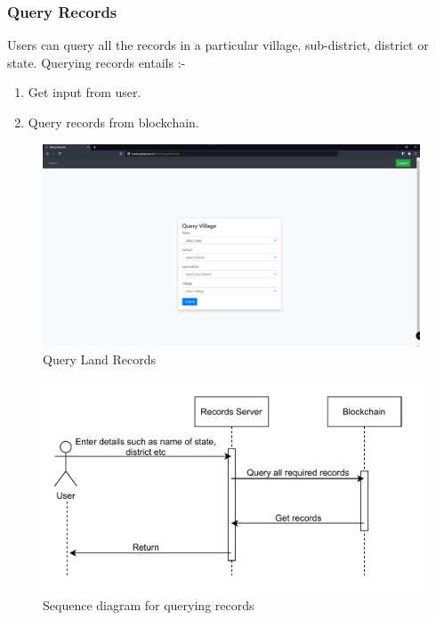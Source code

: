 \documentclass{article}
\begin{document}
           

        \subsubsection{Query Records}
            Users can query all the records in a particular village, sub-district, district or state.
            Querying records entails :-
            \begin{enumerate}
                \item Get input from user.
                \item Query records from blockchain.
            \end{enumerate}
            
            \begin{figure}[htbp]
                \includegraphics[scale=0.25]{records_query_records}
                \centering
                \caption{Query Land Records}
            \end{figure}

            \begin{figure}[htbp]
                \includegraphics[scale=0.25]{records_seq_query_records}
                \centering
                \caption{Sequence diagram for querying records}
            \end{figure}
\end{document}
